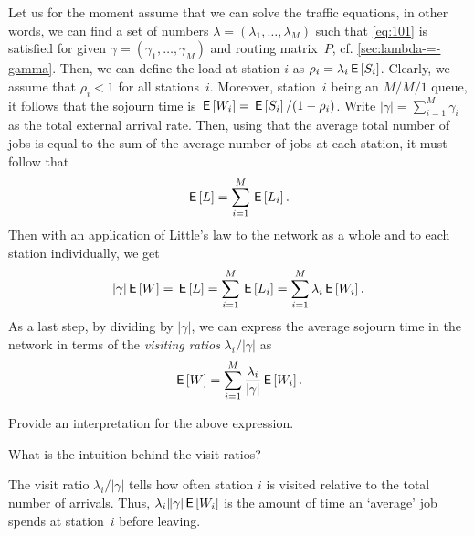 Let us for the moment assume that we can solve the traffic equations, in other words, we can find a set of numbers $\lambda =(\lambda_1, \ldots, \lambda_M)$ such that \cref{eq:101} is satisfied for given $\gamma =(\gamma_1, \ldots, \gamma_M)$ and routing matrix~$P$, cf.
\cref{sec:lambda-=-gamma}.
Then, we can define the load at station $i$ as $\rho_i = \lambda_i \,\mathsf{E}\left[S_i\right]$.
Clearly, we assume that $\rho_i < 1$ for all stations~$i$.
Moreover, station~$i$ being an $M/M/1$ queue, it follows that the sojourn time is $\,\mathsf{E}\left[W_i\right] = \,\mathsf{E}\left[S_i\right]/(1-\rho_i)$.
Write $|\gamma|= \sum_{i=1}^M \gamma_i$ as the total external arrival rate.
Then, using that the average total number of jobs is equal to the sum of the average number of jobs at each station, it must follow that
\begin{equation*}
 \,\mathsf{E}\left[L\right] = \sum_{i=1}^M \,\mathsf{E}\left[L_i\right].
\end{equation*}
Then with an application of Little's law to the network as a whole and to each station individually, we get
\begin{equation*}
  |\gamma| \,\mathsf{E}\left[W\right] = \,\mathsf{E}\left[L\right] = \sum_{i=1}^M \,\mathsf{E}\left[L_i\right] = \sum_{i=1}^M \lambda_i \,\mathsf{E}\left[W_i\right]. 
\end{equation*}
As a last step, by dividing by $|\gamma|$, we can express the average sojourn time in the network in terms of the \emph{visiting ratios} $\lambda_i/|\gamma|$ as
\begin{equation*}
 \,\mathsf{E}\left[W\right] = \sum_{i=1}^M \frac{\lambda_i}{|\gamma|} \,\mathsf{E}\left[W_i\right]. 
\end{equation*}

\begin{exercise}\label{ex:on-5}
  Provide an interpretation for the above expression.
\begin{hint}
    What  is the intuition behind the visit ratios?
\end{hint}
\begin{solution}
  The visit ratio $\lambda_i/|\gamma|$ tells how often station $i$ is visited relative to the total number of arrivals.
  Thus, $\lambda_i\|\gamma| \,\mathsf{E}\left[W_i\right]$ is the amount of time an `average' job spends at station~$i$ before leaving.
\end{solution}
\end{exercise}

